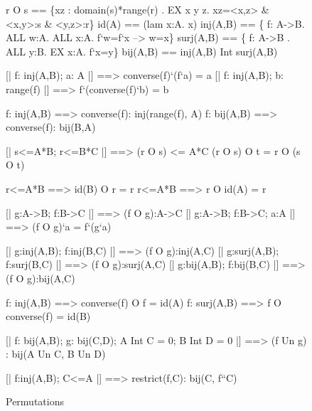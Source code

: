 \begin{figure}
\begin{ttbox}
  r O s     == \{xz : domain(s)*range(r) . 
                        EX x y z. xz=<x,z> & <x,y>:s & <y,z>:r\}
    id(A)     == (lam x:A. x)
   inj(A,B)  == \{ f: A->B. ALL w:A. ALL x:A. f`w=f`x --> w=x\}
  surj(A,B) == \{ f: A->B . ALL y:B. EX x:A. f`x=y\}
   bij(A,B)  == inj(A,B) Int surj(A,B)

     [| f: inj(A,B);  a: A |] ==> converse(f)`(f`a) = a
    [| f: inj(A,B);  b: range(f) |] ==> 
                 f`(converse(f)`b) = b

 f: inj(A,B) ==> converse(f): inj(range(f), A)
 f: bij(A,B) ==> converse(f): bij(B,A)

        [| s<=A*B;  r<=B*C |] ==> (r O s) <= A*C
       (r O s) O t = r O (s O t)

     r<=A*B ==> id(B) O r = r
    r<=A*B ==> r O id(A) = r

        [| g:A->B; f:B->C |] ==> (f O g):A->C
  [| g:A->B; f:B->C; a:A |] ==> (f O g)`a = f`(g`a)

         [| g:inj(A,B);  f:inj(B,C)  |] ==> (f O g):inj(A,C)
        [| g:surj(A,B); f:surj(B,C) |] ==> (f O g):surj(A,C)
         [| g:bij(A,B); f:bij(B,C) |] ==> (f O g):bij(A,C)

     f: inj(A,B) ==> converse(f) O f = id(A)
    f: surj(A,B) ==> f O converse(f) = id(B)

    [| f: bij(A,B);  g: bij(C,D);  A Int C = 0;  B Int D = 0 |] ==> 
    (f Un g) : bij(A Un C, B Un D)

  [| f:inj(A,B);  C<=A |] ==> restrict(f,C): bij(C, f``C)
\end{ttbox}
\caption{Permutations} \label{zf-perm}
\end{figure}

